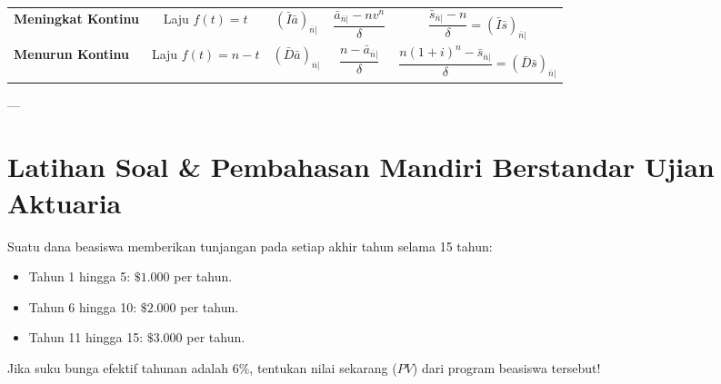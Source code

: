 \documentclass[11pt,a4paper]{article}
\begin{document}
\begin{center}
{\begin{tabular}{lcccc}
\textbf{Meningkat Kontinu} & Laju $f(t) = t$ & $(\bar{I}\bar{a})_{\overline{n}|}$ & $\dfrac{\bar{a}_{\overline{n}|} - n v^n}{\delta}$ & $\dfrac{\bar{s}_{\overline{n}|} - n}{\delta} = (\bar{I}\bar{s})_{\overline{n}|}$ \\[1em]
\textbf{Menurun Kontinu} & Laju $f(t) = n - t$ & $(\bar{D}\bar{a})_{\overline{n}|}$ & $\dfrac{n - \bar{a}_{\overline{n}|}}{\delta}$ & $\dfrac{n(1+i)^n - \bar{s}_{\overline{n}|}}{\delta} = (\bar{D}\bar{s})_{\overline{n}|}$ \\
\bottomrule
\end{tabular}
}
\end{center}

---

\section{Latihan Soal \& Pembahasan Mandiri Berstandar Ujian Aktuaria}

\begin{examplebox}
Suatu dana beasiswa memberikan tunjangan pada setiap akhir tahun selama 15 tahun:
\begin{itemize}
    \item Tahun 1 hingga 5: $\$1.000$ per tahun.
    \item Tahun 6 hingga 10: $\$2.000$ per tahun.
    \item Tahun 11 hingga 15: $\$3.000$ per tahun.
\end{itemize}
Jika suku bunga efektif tahunan adalah $6\%$, tentukan nilai sekarang ($PV$) dari program beasiswa tersebut!
\end{examplebox}
\end{document}
